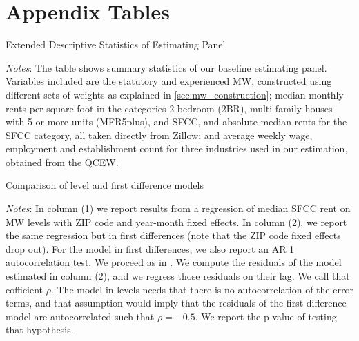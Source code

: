 \section{Appendix Tables}

\begin{table}[h!]
	\caption{Extended Descriptive Statistics of Estimating Panel}
	\label{tab:estimating_panel_stats_long}
	\centering
	
	\begin{minipage}{\textwidth} \footnotesize
		\vspace{3mm} 
		\textit{Notes}: The table shows summary statistics of our baseline estimating panel.
		Variables included are the statutory and experienced MW, constructed using different
		sets of weights as explained in \autoref{sec:mw_construction}; median monthly rents 
		per square foot in the categories 2 bedroom (2BR), multi family houses with 5 or more 
		units (MFR5plus), and SFCC, and absolute median rents for the SFCC category, all taken
		directly from Zillow; and average weekly wage, employment and establishment count 
		for three industries used in our estimation, obtained from the QCEW.
	\end{minipage}
\end{table}

\clearpage
\begin{table}[h!] \centering
	\caption{Comparison of level and first difference models}
	\label{tab:level_auto}
	
	\begin{minipage}{0.9\textwidth} \footnotesize
		\vspace{3mm} 
		\textit{Notes}: In column (1) we report results from a regression of median SFCC rent on 
		MW levels with ZIP code and year-month fixed effects. In column (2), we report the same 
		regression but in first differences (note that the ZIP code  fixed effects drop out). For 
		the model in first differences, we also report an AR 1 autocorrelation test. We proceed as 
		in \parencite[][section 10.6.3]{wooldridge2010}. We compute the residuals of the model 
		estimated in column (2), and we regress those residuals on their lag. We call that cofficient 
		$\rho$. The model in levels needs that there is no autocorrelation of the error terms, and 
		that assumption would imply that the residuals of the first difference model are autocorrelated 
		such that $\rho = -0.5$. We report the p-value of testing that hypothesis.
	\end{minipage} 
\end{table}

